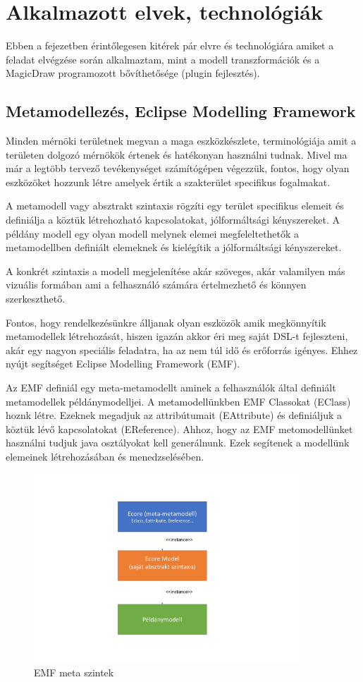 \chapter{Alkalmazott elvek, technológiák}

 Ebben a fejezetben érintőlegesen kitérek pár elvre és technológiára amiket a feladat elvégzése során alkalmaztam, mint a modell transzformációk és a MagicDraw programozott bővíthetősége (plugin fejlesztés).

 \section{Metamodellezés, Eclipse Modelling Framework}
Minden mérnöki területnek megvan a maga eszközkészlete, terminológiája amit a területen dolgozó mérnökök értenek és hatékonyan használni tudnak. Mivel ma már a legtöbb tervező tevékenységet számítógépen végezzük, fontos, hogy olyan eszközöket hozzunk létre amelyek értik a szakterület specifikus fogalmakat.

A metamodell vagy absztrakt szintaxis rögzíti egy terület specifikus elemeit és definiálja a köztük létrehozható kapcsolatokat, jólformáltsági kényszereket. A példány modell egy olyan modell melynek elemei megfeleltethetők a metamodellben definiált elemeknek és kielégítik a jólformáltsági kényszereket.

A konkrét szintaxis a modell megjelenítése akár szöveges, akár valamilyen más vizuális formában ami a felhasználó számára értelmezhető és könnyen szerkeszthető.

Fontos, hogy rendelkezésünkre álljanak olyan eszközök amik megkönnyítik metamodellek létrehozását, hiszen igazán akkor éri meg saját DSL-t fejleszteni, akár egy nagyon speciális feladatra, ha az nem túl idő és erőforrás igényes. Ehhez nyújt segítséget Eclipse Modelling Framework (EMF).

Az EMF definiál egy meta-metamodellt aminek a felhasználók által definiált metamodellek példánymodelljei. A metamodellünkben EMF Classokat (EClass) hoznk létre. Ezeknek megadjuk az attribútumait (EAttribute) és definiáljuk a köztük lévő kapcsolatokat (EReference). Ahhoz, hogy az EMF metomodellünket használni tudjuk java osztályokat kell generálnunk. Ezek segítenek a modellünk elemeinek létrehozásában és menedzselésében.

 
 \begin{figure}[!ht]
 	\centering
 	\includegraphics[width=100mm, keepaspectratio]{figures/ECore.pdf}
 	\caption{EMF meta szintek}
 	\label{fig:concept}
 \end{figure}
 

